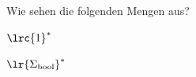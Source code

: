 %
%
%

\begin{myexercise}\label{myexercise:0201}
	Wie sehen die folgenden Mengen aus?
	\begin{aenum}
		\item $\lrc{1}^{*}$
		\item $\lr{\Sigma_{\text{bool}}}^{*}$
	\end{aenum}
\end{myexercise}


